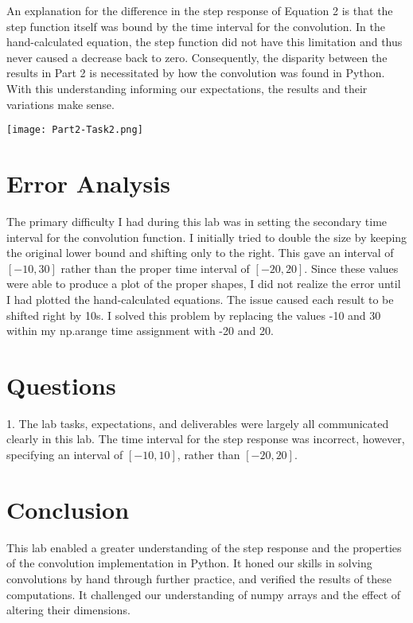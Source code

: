 \documentclass[12pt]{report}
\begin{document}
An explanation for the difference in the step response of Equation 2 is that the step function itself was bound by the time interval for the convolution. In the hand-calculated equation, the step function did not have this limitation and thus never caused a decrease back to zero. Consequently, the disparity between the results in Part 2 is necessitated by how the convolution was found in Python. With this understanding informing our expectations, the results and their variations make sense. \\

\begin{center}
	\texttt{[image: Part2-Task2.png]}\\[1.0 cm]
\end{center}
	
\section{Error Analysis}
	
The primary difficulty I had during this lab was in setting the secondary time interval for the convolution function. I initially tried to double the size by keeping the original lower bound and shifting only to the right. This gave an interval of $ [-10,30] $ rather than the proper time interval of $ [-20,20] $. Since these values were able to produce a plot of the proper shapes, I did not realize the error until I had plotted the hand-calculated equations. The issue caused each result to be shifted right by 10s. I solved this problem by replacing the values -10 and 30 within my np.arange time assignment with -20 and 20.  \\
	
\section{Questions}
	
1. The lab tasks, expectations, and deliverables were largely all communicated clearly in this lab. The time interval for the step response was incorrect, however, specifying an interval of $ [-10,10] $, rather than $ [-20,20] $. \\
	
\section{Conclusion}
	
This lab enabled a greater understanding of the step response and the properties of the convolution implementation in Python. It honed our skills in solving convolutions by hand through further practice, and verified the results of these computations. It challenged our understanding of numpy arrays and the effect of altering their dimensions. \\ 
\end{document}

